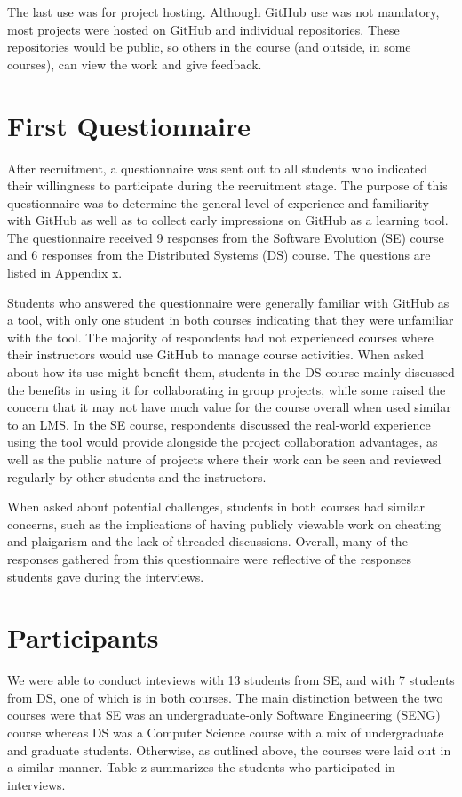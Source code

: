 The last use was for project hosting. Although GitHub use was not mandatory, most projects were hosted on GitHub and individual repositories. These repositories would be public, so others in the course (and outside, in some courses), can view the work and give feedback. %

\section{First Questionnaire}
After recruitment, a questionnaire was sent out to all students who indicated their willingness to participate during the recruitment stage. The purpose of this questionnaire was to determine the general level of experience and familiarity with GitHub as well as to collect early impressions on GitHub as a learning tool. The questionnaire received 9 responses from the Software Evolution (SE) course and 6 responses from the Distributed Systems (DS) course. The questions are listed in Appendix x.


Students who answered the questionnaire were generally familiar with GitHub as a tool, with only one student in both courses indicating that they were unfamiliar with the tool. The majority of respondents had not experienced courses where their instructors would use GitHub to manage course activities. When asked about how its use might benefit them, students in the DS course mainly discussed the benefits in using it for collaborating in group projects, while some raised the concern that it may not have much value for the course overall when used similar to an LMS. In the SE course, respondents discussed the real-world experience using the tool would provide alongside the project collaboration advantages, as well as the public nature of projects where their work can be seen and reviewed regularly by other students and the instructors.

When asked about potential challenges, students in both courses had similar concerns, such as the implications of having publicly viewable work on cheating and plaigarism and the lack of threaded discussions. Overall, many of the responses gathered from this questionnaire were reflective of the responses students gave during the interviews.

\section{Participants}
We were able to conduct inteviews with 13 students from SE, and with 7 students from DS, one of which is in both courses. The main distinction between the two courses were that SE was an undergraduate-only Software Engineering (SENG) course whereas DS was a Computer Science course with a mix of undergraduate and graduate students. Otherwise, as outlined above, the courses were laid out in a similar manner. Table z summarizes the students who participated in interviews.

